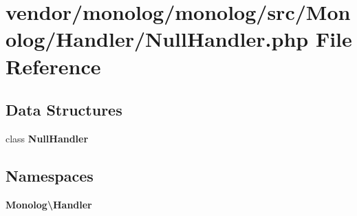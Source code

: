 \section{vendor/monolog/monolog/src/\+Monolog/\+Handler/\+Null\+Handler.php File Reference}
\label{_null_handler_8php}
\subsection*{Data Structures}
\begin{DoxyCompactItemize}
\item 
class {\bf Null\+Handler}
\end{DoxyCompactItemize}
\subsection*{Namespaces}
\begin{DoxyCompactItemize}
\item 
 {\bf Monolog\textbackslash{}\+Handler}
\end{DoxyCompactItemize}
